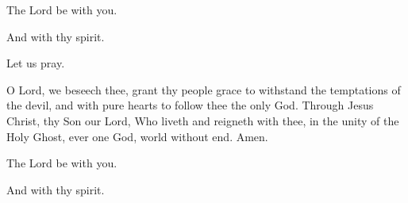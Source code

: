 

\rubric{\Vbar}The Lord be with you.

\rubric{\Rbar}And with thy spirit.

Let us pray.

O Lord, we beseech thee, grant thy people grace to withstand the temptations of the devil, and with pure hearts to follow thee the only God. Through Jesus Christ, thy Son our Lord, Who liveth and reigneth with thee, in the unity of the Holy Ghost, ever one God, world without end.\rubric{\Rbar} Amen.

\rubric{\Vbar}The Lord be with you.

\rubric{\Rbar}And with thy spirit.
